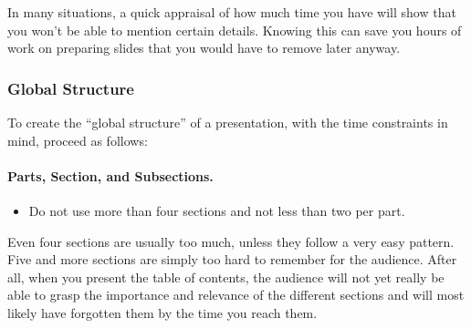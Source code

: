 In many situations, a quick appraisal of how much time you have will
show that you won't be able to mention certain details. Knowing this can
save you hours of work on preparing slides that you would have to remove
later anyway.



\subsubsection{Global Structure}

To create the ``global structure'' of a presentation, with the time
constraints in mind, proceed as follows:



\paragraph{Parts, Section, and Subsections.}

\begin{itemize}
\item
  Do not use more than four sections and not less than two per
  part.
\end{itemize}
Even four sections are usually too much, unless they follow 
a very easy pattern. Five and more sections are simply too hard to
remember for the audience. After all, when you present the table of
contents, the audience will not yet really be able to grasp the
importance and relevance of the different sections and will most
likely have forgotten them by the time you reach them.

